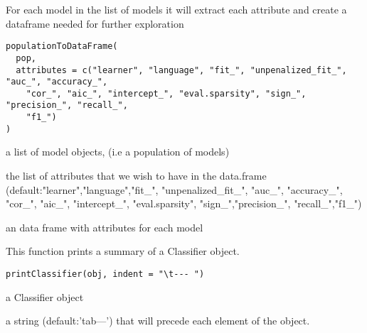 \documentclass[a4paper]{book}
\begin{document}
%
\begin{Description}
For each model in the list of models it will extract each attribute and create a dataframe needed for further exploration
\end{Description}
%
\begin{Usage}
\begin{verbatim}
populationToDataFrame(
  pop,
  attributes = c("learner", "language", "fit_", "unpenalized_fit_", "auc_", "accuracy_",
    "cor_", "aic_", "intercept_", "eval.sparsity", "sign_", "precision_", "recall_",
    "f1_")
)
\end{verbatim}
\end{Usage}
%
\begin{Arguments}
\begin{ldescription}
\item[\code{pop:}] a list of model objects, (i.e a population of models)

\item[\code{attributes:}] the list of attributes that we wish to have in the data.frame (default:"learner","language","fit\_", "unpenalized\_fit\_", "auc\_", "accuracy\_", "cor\_", "aic\_", "intercept\_", "eval.sparsity", "sign\_","precision\_", "recall\_","f1\_")
\end{ldescription}
\end{Arguments}
%
\begin{Value}
an data frame with attributes for each model
\end{Value}
%
\begin{Description}
This function prints a summary of a Classifier object.
\end{Description}
%
\begin{Usage}
\begin{verbatim}
printClassifier(obj, indent = "\t--- ")
\end{verbatim}
\end{Usage}
%
\begin{Arguments}
\begin{ldescription}
\item[\code{obj:}] a Classifier object

\item[\code{indent:}] a string (default:'tab---') that will precede each element of the object.
\end{ldescription}
\end{Arguments}
\end{document}
